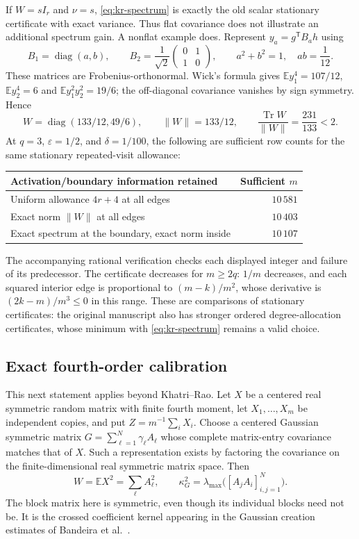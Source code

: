 \documentclass[11pt,a4paper]{article}
\theoremstyle{definition}\newtheorem{definition}[theorem]{Definition}
\theoremstyle{remark}\newtheorem{remark}[theorem]{Remark}
\numberwithin{equation}{section}
\begin{document}
If $W=sI_r$ and $\nu=s$, \eqref{eq:kr-spectrum} is exactly the old scalar
stationary certificate with exact variance. Thus flat covariance does not
illustrate an additional spectrum gain. A nonflat example does. Represent
$y_a=g^{\mathsf T}B_a h$ using
\[
 B_1=\operatorname{diag}(a,b),\qquad
 B_2=\frac1{\sqrt2}\begin{pmatrix}0&1\\1&0\end{pmatrix},\qquad
 a^2+b^2=1,\quad ab=\frac1{12}.
\]
These matrices are Frobenius-orthonormal. Wick's formula gives
$\mathbb Ey_1^4=107/12$, $\mathbb Ey_2^4=6$ and
$\mathbb Ey_1^2y_2^2=19/6$; the off-diagonal covariance vanishes by sign
symmetry. Hence
\[
 W=\operatorname{diag}(133/12,49/6),\qquad
 \|W\|=133/12,\qquad
 \frac{\operatorname{Tr}W}{\|W\|}=\frac{231}{133}<2.
\]
At $q=3$, $\varepsilon=1/2$, and $\delta=1/100$, the following are sufficient
row counts for the same stationary repeated-visit allowance:
\begin{center}
\begin{tabular}{lr}
\toprule
Activation/boundary information retained & Sufficient $m$\\
\midrule
Uniform allowance $4r+4$ at all edges & $10\,581$\\
Exact norm $\|W\|$ at all edges & $10\,403$\\
Exact spectrum at the boundary, exact norm inside & $10\,107$\\
\bottomrule
\end{tabular}
\end{center}
The accompanying rational verification checks each displayed integer and
failure of its predecessor. The certificate decreases for $m\ge2q$:
$1/m$ decreases, and each squared interior edge is proportional to
$(m-k)/m^2$, whose derivative is $(2k-m)/m^3\le0$ in this range.
These are comparisons of stationary certificates: the original manuscript
also has stronger ordered degree-allocation certificates, whose minimum
with \eqref{eq:kr-spectrum} remains a valid choice.

\subsection{Exact fourth-order calibration}

This next statement applies beyond Khatri--Rao. Let $X$ be a centered real
symmetric random matrix with finite fourth moment, let $X_1,\ldots,X_m$ be
independent copies, and put $Z=m^{-1}\sum_iX_i$. Choose a centered Gaussian
symmetric matrix $G=\sum_{\ell=1}^N\gamma_\ell A_\ell$ whose complete
matrix-entry covariance matches that of $X$. Such a representation exists
by factoring the covariance on the finite-dimensional real symmetric matrix
space. Then
\[
 W=\mathbb EX^2=\sum_\ell A_\ell^2,\qquad
 \kappa_G^2=\lambda_{\max}\bigl([A_jA_i]_{i,j=1}^N\bigr).
\]
The block matrix here is symmetric, even though its individual blocks need
not be. It is the crossed coefficient kernel appearing in the Gaussian
creation estimates of Bandeira et al.~\cite{Bandeira}.
\end{document}
